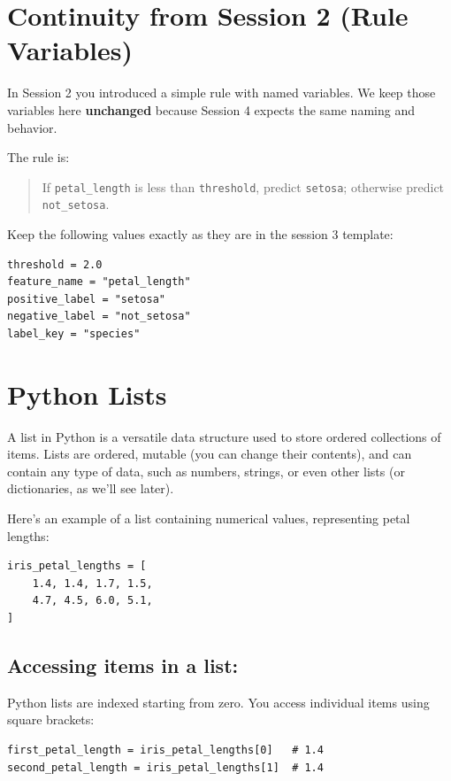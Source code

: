 \section{Continuity from Session 2 (Rule Variables)}
In Session 2 you introduced a simple rule with named variables. We keep those variables here \textbf{unchanged} because Session 4 expects the same naming and behavior.

The rule is:
\begin{quote}
If \texttt{petal\_length} is less than \texttt{threshold}, predict \texttt{setosa}; otherwise predict \texttt{not\_setosa}.
\end{quote}

Keep the following values exactly as they are in the session 3 template:
\begin{verbatim}
threshold = 2.0
feature_name = "petal_length"
positive_label = "setosa"
negative_label = "not_setosa"
label_key = "species"
\end{verbatim}

\section{Python Lists}

A list in Python is a versatile data structure used to store ordered collections of items. Lists are ordered, mutable (you can change their contents), and can contain any type of data, such as numbers, strings, or even other lists (or dictionaries, as we'll see later).

Here's an example of a list containing numerical values, representing petal lengths:

\begin{verbatim}
iris_petal_lengths = [
    1.4, 1.4, 1.7, 1.5,
    4.7, 4.5, 6.0, 5.1,
]
\end{verbatim}

\subsection{Accessing items in a list:} Python lists are indexed starting from zero. You access individual items using square brackets:
\begin{verbatim}
first_petal_length = iris_petal_lengths[0]   # 1.4
second_petal_length = iris_petal_lengths[1]  # 1.4
\end{verbatim}

